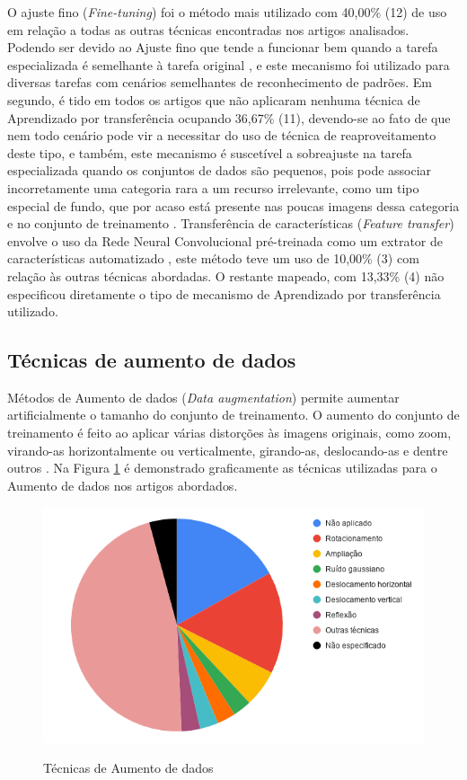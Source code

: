 \documentclass[
	12pt,				%
	oneside,			%
	a4paper,			%
	english,			%
	brazil				%
	]{abntex2ppgsi}
\begin{document}
O ajuste fino (\textit{Fine-tuning}) foi o método mais utilizado com 40,00\% (12) de uso em relação a todas as outras técnicas encontradas nos artigos analisados. Podendo ser devido ao Ajuste fino que tende a funcionar bem quando a tarefa especializada é semelhante à tarefa original \cite{valan2019automated}, e este mecanismo foi utilizado para diversas tarefas com cenários semelhantes de reconhecimento de padrões. Em segundo, é tido em todos os artigos que não aplicaram nenhuma técnica de Aprendizado por transferência ocupando 36,67\% (11), devendo-se ao fato de que nem todo cenário pode vir a necessitar do uso de técnica de reaproveitamento deste tipo, e também, este mecanismo é suscetível a sobreajuste na tarefa especializada quando os conjuntos de dados são pequenos, pois pode associar incorretamente uma categoria rara a um recurso irrelevante, como um tipo especial de fundo, que por acaso está presente nas poucas imagens dessa categoria e no conjunto de treinamento \cite{valan2019automated}. Transferência de características (\textit{Feature transfer}) envolve o uso da Rede Neural Convolucional pré-treinada como um extrator de características automatizado \cite{valan2019automated}, este método teve um uso de 10,00\% (3) com relação às outras técnicas abordadas. O restante mapeado, com 13,33\% (4) não especificou diretamente o tipo de mecanismo de Aprendizado por transferência utilizado.

\subsection{Técnicas de aumento de dados}

Métodos de Aumento de dados (\textit{Data augmentation}) permite aumentar artificialmente o tamanho do conjunto de treinamento. O aumento do conjunto de treinamento é feito ao aplicar várias distorções às imagens originais, como zoom, virando-as horizontalmente ou verticalmente, girando-as, deslocando-as e dentre outros \cite{gomez2019coral}. Na Figura \ref{fig:grafico_aumento-dados_vs_uso} é demonstrado graficamente as técnicas utilizadas para o Aumento de dados nos artigos abordados.

\begin{figure}[H]
    \centering
    \caption{Técnicas de Aumento de dados}
    \includegraphics[scale=.60]{imagens/grafico_aumento-dados_vs_uso.png}
    \label{fig:grafico_aumento-dados_vs_uso}
\end{figure}
\end{document}

